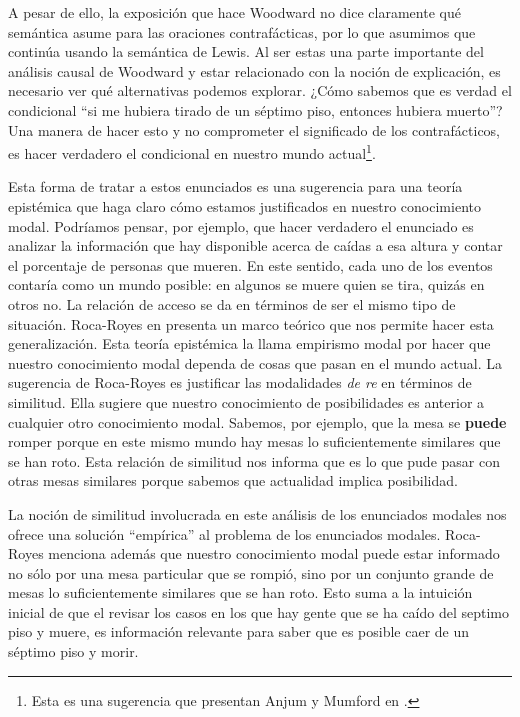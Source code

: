 {A pesar de ello, la exposición que hace Woodward no dice claramente qué semántica asume para las oraciones contrafácticas, por lo que asumimos que continúa usando la semántica de Lewis. Al ser estas una parte importante del análisis causal de Woodward y estar relacionado con la noción de explicación, es necesario ver qué alternativas podemos explorar. ¿Cómo sabemos que es verdad el condicional ``si me hubiera tirado de un séptimo piso, entonces hubiera muerto''? Una manera de hacer esto y no comprometer el significado de los contrafácticos, es hacer verdadero el condicional en nuestro mundo actual\footnote{Esta es una sugerencia que presentan Anjum y Mumford en \cite{Mumford2013}.}.

Esta forma de tratar a estos enunciados es una sugerencia para una teoría epistémica que haga claro cómo estamos justificados en nuestro conocimiento modal. Podríamos pensar, por ejemplo, que hacer verdadero el enunciado es analizar la información que hay disponible acerca de caídas a esa altura y contar el porcentaje de personas que mueren. En este sentido, cada uno de los eventos contaría como un mundo posible: en algunos se muere quien se tira, quizás en otros no. La relación de acceso se da en términos de ser el mismo tipo de situación. Roca-Royes en \citeyear{rocaroyes} presenta un marco teórico que nos permite hacer esta generalización. Esta teoría epistémica la llama empirismo modal por hacer que nuestro conocimiento modal dependa de cosas que pasan en el mundo actual. La sugerencia de Roca-Royes es justificar las modalidades \textit{de re} en términos de similitud. Ella sugiere que nuestro conocimiento de posibilidades es anterior a cualquier otro conocimiento modal. Sabemos, por ejemplo, que la mesa se \textbf{puede} romper porque en este mismo mundo hay mesas lo suficientemente similares que se han roto. Esta relación de similitud nos informa que es lo que pude pasar con otras mesas similares porque sabemos que actualidad implica posibilidad.

La noción de similitud involucrada en este análisis de los enunciados modales nos ofrece una solución ``empírica'' al problema de los enunciados modales. Roca-Royes menciona además que nuestro conocimiento modal puede estar informado no sólo por una mesa particular que se rompió, sino por un conjunto grande de mesas lo suficientemente similares que se han roto. Esto suma a la intuición inicial de que el revisar los casos en los que hay gente que se ha caído del septimo piso y muere, es información relevante para saber que es posible caer de un séptimo piso y morir.

}
